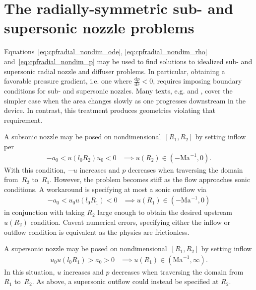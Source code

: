 \documentclass[letterpaper,11pt,nointlimits,reqno]{amsart}
\newcommand{\Mach}[1][]{\ensuremath{\mbox{Ma}_{#1}}}
\begin{document}
\section{The radially-symmetric sub- and supersonic nozzle problems}

Equations~\eqref{eq:cpfradial_nondim_ode}, \eqref{eq:cpfradial_nondim_rho}
and~\eqref{eq:cpfradial_nondim_p} may be used to find solutions to idealized
sub- and supersonic radial nozzle and diffuser problems.  In particular,
obtaining a favorable pressure gradient, i.e. one where
$\frac{\mathrm{d}p}{\mathrm{d}r} < 0$, requires imposing boundary conditions
for sub- and supersonic nozzles.  Many texts, e.g.
\citet[\textsection{}9.4]{White1999Fluid} and
\citet[\textsection{}97]{Landau2004Fluid}, cover the simpler case when the area
changes slowly as one progresses downstream in the device.  In contrast, this
treatment produces geometries violating that requirement.

A subsonic nozzle may be posed on nondimensional~$\left[R_{1}, R_{2}\right]$ by
setting inflow per
\begin{align}
    -a_0 < u\!\left(l_0 R_{2}\right) u_0 < 0
    &\implies
    u\!\left(R_{2}\right) \in \left(-\Mach^{-1}, 0\right)
.
\end{align}
With this condition, $-u$ increases and $p$ decreases when traversing the
domain from~$R_{2}$ to~$R_{1}$.  However, the problem becomes stiff as the flow
approaches sonic conditions.  A workaround is specifying at most a sonic
outflow via
\begin{align}
    -a_0 < u_0 u\!\left(l_0 R_1\right) < 0
    &\implies
    u\!\left(R_1\right) \in \left(-\Mach^{-1}, 0\right)
\label{eq:cpfradial_nozzle_subsonic_bc}
\end{align}
in conjunction with taking $R_{2}$ large enough to obtain the desired upstream
$u\!\left(R_{2}\right)$ condition.  Caveat numerical errors, specifying either
the inflow or outflow condition is equivalent as the physics are frictionless.

A supersonic nozzle may be posed on nondimensional~$\left[R_{1}, R_{2}\right]$
by setting inflow
\begin{align}
    u_0 u\!\left(l_0 R_{1}\right) > a_0 > 0
    &\implies
    u\!\left(R_{1}\right) \in \left(\Mach^{-1}, \infty\right)
\label{eq:cpfradial_nozzle_supersonic_bc}
.
\end{align}
In this situation, $u$ increases and $p$ decreases when traversing the domain
from~$R_{1}$ to~$R_{2}$.  As above, a supersonic outflow could instead be
specified at $R_{2}$.
\end{document}
